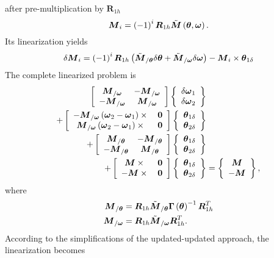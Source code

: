 \documentclass[10pt,dvips,fleqn,subeqn]{report}
\newcommand{\T}[1]{\boldsymbol{#1}}
\begin{document}
after pre-multiplication by $\T{R}_{1h}$
\begin{equation}
	\T{M}_i = \plbr{-1}^i \T{R}_{1h} \tilde{\T{M}}\plbr{\T{\theta}, \T{\omega}} .
\end{equation}
Its linearization yields
\begin{equation}
	\delta\T{M}_i = \plbr{-1}^i \T{R}_{1h} \plbr{
		\tilde{\T{M}}_{/\T{\theta}} \delta \T{\theta}
		+ \tilde{\T{M}}_{/\T{\omega}} \delta\T{\omega}
	} - \T{M}_i \times \T{\theta}_{1\delta}
\end{equation}
The complete linearized problem is
\begin{align}
	\sqbr{\matr{cc}{
		\T{M}_{/\T{\omega}} & - \T{M}_{/\T{\omega}} \\
		- \T{M}_{/\T{\omega}} & \T{M}_{/\T{\omega}}
	}}\cubr{\cvvect{
		\delta\T{\omega}_1 \\
		\delta\T{\omega}_2
	}} & \nonumber \\
	+ \sqbr{\matr{cc}{
		- \T{M}_{/\T{\omega}} \plbr{\T{\omega}_2 - \T{\omega}_1}\times{} & \T{0} \\
		\T{M}_{/\T{\omega}} \plbr{\T{\omega}_2 - \T{\omega}_1}\times{} & \T{0}
	}} \cubr{\cvvect{
		\T{\theta}_{1\delta} \\
		\T{\theta}_{2\delta}
	}} & \nonumber \\
	+ \sqbr{\matr{cc}{
		\T{M}_{/\T{\theta}} & - \T{M}_{/\T{\theta}} \\
		- \T{M}_{/\T{\theta}} & \T{M}_{/\T{\theta}}
	}} \cubr{\cvvect{
		\T{\theta}_{1\delta} \\
		\T{\theta}_{2\delta}
	}} & \nonumber \\
	+ \sqbr{\matr{cc}{
		\T{M}\times{} & \T{0} \\
		- \T{M}\times{} & \T{0}
	}} \cubr{\cvvect{
		\T{\theta}_{1\delta} \\
		\T{\theta}_{2\delta}
	}} &= \cubr{\cvvect{
		\T{M} \\
		- \T{M}
	}} ,
\end{align}
where
\begin{align}
	\T{M}_{/\T{\theta}} &= \T{R}_{1h} \tilde{\T{M}}_{/\T{\theta}} \T{\Gamma}\plbr{\T{\theta}}^{-1} \T{R}_{1h}^T \\
	\T{M}_{/\T{\omega}} &= \T{R}_{1h} \tilde{\T{M}}_{/\T{\omega}} \T{R}_{1h}^T .
\end{align}
According to the simplifications of the updated-updated approach, the linearization becomes
\end{document}
